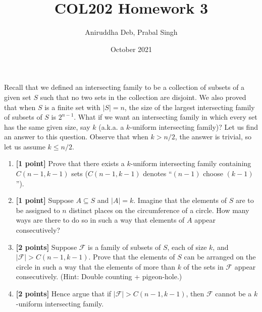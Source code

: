 \documentclass[12pt,answers]{exam}
\title{\vspace{-2em}COL202 Homework 3\vspace{-0.3em}}
\author{Aniruddha Deb, Prabal Singh\vspace{-1em}}
\date{October 2021}
\begin{document}
\maketitle
\pagestyle{empty}
\begin{questions}

\question Recall that we defined an intersecting family to be a collection of subsets of a given set $S$ such that no two sets in the collection are disjoint. We also proved that when $S$ is a finite set with $|S|=n$, the size of the largest intersecting family of subsets of $S$ is $2^{n-1}$. What if we want an intersecting family in which every set has the same given size, say $k$ (a.k.a. a $k$-uniform intersecting family)? Let us find an answer to this question. Observe that when $k>n/2$, the answer is trivial, so let us assume $k\leq n/2$.
\begin{enumerate}
\item\textbf{[1 point]} Prove that there exists a $k$-uniform intersecting family containing $C(n-1,k-1)$ sets ($C(n-1,k-1)$ denotes ``$(n-1)$ choose $(k-1)$'').
\item\textbf{[1 point]} Suppose $A\subseteq S$ and $|A|=k$. Imagine that the elements of $S$ are to be assigned to $n$ distinct places on the circumference of a circle. How many ways are there to do so in such a way that elements of $A$ appear consecutively?
\item\textbf{[2 points]} Suppose $\mathcal{F}$ is a family of subsets of $S$, each of size $k$, and $|\mathcal{F}|>C(n-1,k-1)$. Prove that the elements of $S$ can be arranged on the circle in such a way that the elements of more than $k$ of the sets in $\mathcal{F}$ appear consecutively. (Hint: Double counting + pigeon-hole.)
\item\textbf{[2 points]} Hence argue that if $|\mathcal{F}|>C(n-1,k-1)$, then $\mathcal{F}$ cannot be a $k$-uniform intersecting family.
\end{enumerate}


\end{questions}
\end{document}
